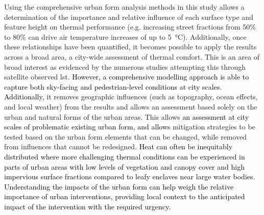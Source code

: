 \documentclass[final,3p,times,authoryear]{elsarticle}
\newcommand{\add}[1]{\textcolor{black}{#1}}
\newcommand{\remove}[1]{\textcolor{red}{\st{}}}
\begin{document}
Using the comprehensive urban form analysis methods in this study allows a determination of the importance and relative influence of each surface type and feature height on thermal performance (e.g. increasing street fractions from 50\% to 80\% can drive air temperature increases of up to 5\SI{}{\degreeCelsius}). Additionally, once these relationships have been quantified, it becomes possible to apply the results across a broad area, a city-wide assessment of thermal comfort. This is an area of broad interest as evidenced by the numerous studies attempting this through satellite observed \gls{lst}. \remove{But the modelled approach eliminates the difficulty using top of the canopy lst observations to derive ground level temperatures, temperatures that also include the shading impacts of the urban canopy. More importantly,}\add{However, a comprehensive modelling approach is able to capture both sky-facing and pedestrian-level conditions at city scales. Additionally,} it removes geographic influences (such as topography, ocean effects, and local weather) from the results and allows an assessment based solely on the urban and natural forms of the urban areas. This allows \add{an assessment at city scales of problematic existing urban form, and allows} mitigation strategies to be tested based on the urban form elements that can be changed, while removed from influences that cannot be redesigned. \add{Heat can often be inequitably distributed \citep{Jenerette2018,Nazarian2021,Guardaro2022} where more challenging thermal conditions can be experienced in parts of urban areas with low levels of vegetation and canopy cover and high impervious surface fractions compared to leafy enclaves near large water bodies. Understanding the impacts of the urban form can help weigh the relative importance of urban interventions, providing local context to the anticipated impact of the intervention with the required urgency.}
\end{document}
